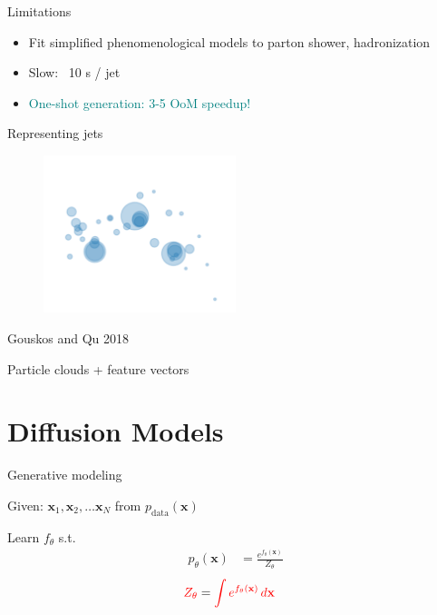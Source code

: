 \documentclass[aspectratio=169,xcolor=dvipsnames]{beamer}
\newcommand{\bx}{\mathbf{x}}
\begin{document}
\begin{frame}{Limitations}
  \begin{itemize}
    \pause
    \item Fit simplified phenomenological models to parton shower, hadronization
    \pause
    \item Slow: ~10 s / jet
    \pause
    \item \textcolor{teal}{One-shot generation: 3-5 OoM speedup!}
  \end{itemize}
\end{frame}


\begin{frame}{Representing jets}

  \pause

  \begin{figure}
    \centering
    \includegraphics[width=0.5\textwidth]{figs/point-cloud-Gouskos-2018.png}
  \end{figure}
  \begin{center}
    \tiny{Gouskos and Qu 2018}
  \end{center}

  \pause
  \centering
  Particle clouds + feature vectors
  
\end{frame}

\section{Diffusion Models}
\begin{frame}{Generative modeling}

\pause

Given: $\bx_1, \bx_2, \dots \bx_N$ from $p_\text{data}(\bx)$
\vspace{0.25cm}
\pause

Learn $f_\theta$ s.t.
\begin{eqnarray*}
    p_{\theta}(\bx) &= \frac{e^{f_\theta(\bx)}}{Z_\theta}
\end{eqnarray*}
\pause
\begin{align*}
    \textcolor{red}{Z_\theta} &= \textcolor{red}{\int e^{f_\theta(\bx)} \,d\bx}
\end{align*}

\end{frame}
\end{document}

